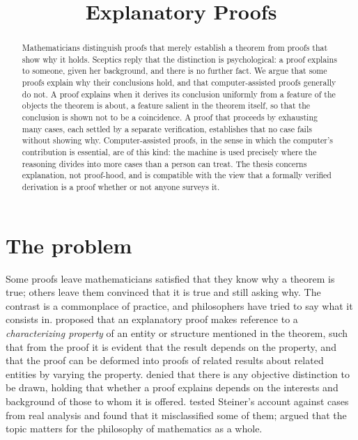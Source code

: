 \documentclass{situationist-preprint}
\title{Explanatory Proofs}
\begin{document}
\maketitle

\begin{abstract}
Mathematicians distinguish proofs that merely establish a theorem from proofs that show why it holds. Sceptics reply that the distinction is psychological: a proof explains to someone, given her background, and there is no further fact. We argue that some proofs explain why their conclusions hold, and that computer-assisted proofs generally do not. A proof explains when it derives its conclusion uniformly from a feature of the objects the theorem is about, a feature salient in the theorem itself, so that the conclusion is shown not to be a coincidence. A proof that proceeds by exhausting many cases, each settled by a separate verification, establishes that no case fails without showing why. Computer-assisted proofs, in the sense in which the computer's contribution is essential, are of this kind: the machine is used precisely where the reasoning divides into more cases than a person can treat. The thesis concerns explanation, not proof-hood, and is compatible with the view that a formally verified derivation is a proof whether or not anyone surveys it.
\end{abstract}

\section{The problem}

Some proofs leave mathematicians satisfied that they know why a theorem is true; others leave them convinced that it is true and still asking why. The contrast is a commonplace of practice, and philosophers have tried to say what it consists in. \citet{Steiner1978} proposed that an explanatory proof makes reference to a \emph{characterizing property} of an entity or structure mentioned in the theorem, such that from the proof it is evident that the result depends on the property, and that the proof can be deformed into proofs of related results about related entities by varying the property. \citet{ResnikKushner1987} denied that there is any objective distinction to be drawn, holding that whether a proof explains depends on the interests and background of those to whom it is offered. \citet{HafnerMancosu2005} tested Steiner's account against cases from real analysis and found that it misclassified some of them; \citet{Mancosu2008} argued that the topic matters for the philosophy of mathematics as a whole.
\end{document}
